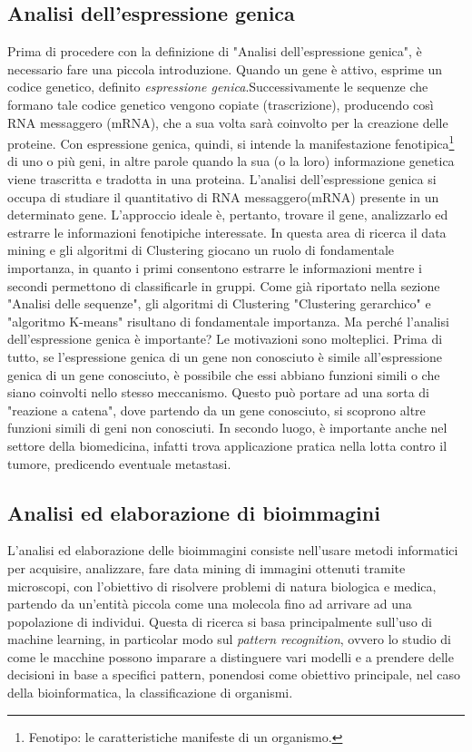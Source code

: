 \subsection{Analisi dell'espressione genica}
Prima di procedere con la definizione di "Analisi dell'espressione genica", è necessario fare una piccola introduzione. Quando un gene è attivo, esprime un codice genetico, definito \textit{espressione genica}.Successivamente le sequenze che formano tale codice genetico vengono copiate (trascrizione), producendo così RNA messaggero (mRNA), che a sua volta sarà coinvolto per la creazione delle proteine.
\newline
Con espressione genica, quindi, si intende la manifestazione fenotipica\footnote{Fenotipo: le caratteristiche manifeste di un organismo.} di uno o più geni, in altre parole quando la sua (o la loro) informazione genetica viene trascritta e tradotta in una proteina.
\newline
L'analisi dell'espressione genica si occupa di studiare il quantitativo di RNA messaggero(mRNA) presente in un determinato gene.
L'approccio ideale è, pertanto, trovare il gene, analizzarlo ed estrarre le informazioni fenotipiche interessate.
\newline
In questa area di ricerca il data mining e gli algoritmi di Clustering giocano un ruolo di fondamentale importanza, in quanto i primi consentono estrarre le informazioni mentre i secondi permettono di classificarle in gruppi. Come già riportato nella sezione "Analisi delle sequenze", gli algoritmi di Clustering "Clustering gerarchico" e "algoritmo K-means" risultano di fondamentale importanza.
\newline
Ma perché l'analisi dell'espressione genica è importante? Le motivazioni sono molteplici. Prima di tutto, se l'espressione genica di un gene non conosciuto è simile all'espressione genica di un  gene conosciuto, è possibile che essi abbiano funzioni simili o che siano coinvolti nello stesso meccanismo. Questo può portare ad una sorta di "reazione a catena", dove partendo da un gene conosciuto, si scoprono altre funzioni simili di geni non conosciuti. In secondo luogo, è importante anche nel settore della biomedicina, infatti trova applicazione pratica nella lotta contro il tumore, predicendo eventuale metastasi.

\subsection{Analisi ed elaborazione di bioimmagini}
L'analisi ed elaborazione delle bioimmagini consiste nell'usare metodi informatici per acquisire, analizzare, fare data mining di immagini ottenuti tramite microscopi, con l'obiettivo di risolvere problemi di natura biologica e medica, partendo da un'entità piccola come una molecola fino ad arrivare ad una popolazione di individui.
Questa di ricerca si basa principalmente sull'uso di machine learning, in particolar modo sul \textit{pattern recognition}, ovvero lo studio di come le macchine possono imparare a distinguere vari modelli e a prendere delle decisioni in base a specifici pattern, ponendosi come obiettivo principale, nel caso della bioinformatica, la classificazione di organismi.

